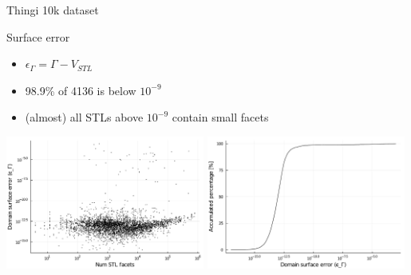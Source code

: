 \documentclass{beamer}
\begin{document}
\begin{frame}{Thingi 10k dataset}

  \begin{block}{Surface error}
  \begin{itemize}
    \item
      $\epsilon_\Gamma = \Gamma - V_{STL}$
    \item
      98.9\% of 4136 is below $10^{-9}$
    \item
      (almost) all STLs above $10^{-9}$ contain small facets
  \end{itemize}
  \end{block}

  \includegraphics[width=0.49\textwidth]{../analysis/plots/num_stl_facets_surface_error}
  \includegraphics[width=0.49\textwidth]{../analysis/plots/histogram_surface_error}
\end{frame}
\end{document}
